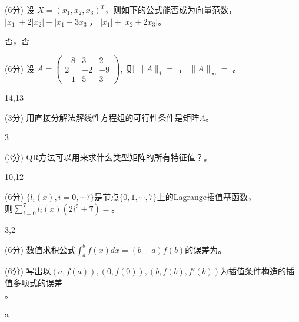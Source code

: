 \documentclass[12pt,letter]{ustcexam}
\def\ds{\displaystyle}
\begin{document}
\begin{problems}
\qu (6分) 设 $X=(x_1,x_2,x_3)^T$，则如下的公式能否成为向量范数， \\
$|x_1|+2|x_2|+|x_1-3x_3|$\twob\oneb ，
$|x_1|+|x_2+2x_3|$\twob\oneb 。
\begin{sol}
 否，否
\end{sol}

\question (6分) 设 $ \ds{A=\begin {pmatrix} -8 & 3 & 2 \\
2 & -2 & -9 \\ -1 & 5 & 3 \end {pmatrix}}$,\  则 $ \|A\|_1=$ \sixb ，
$ \|A\|_\infty =$ \sixb 。
\begin{sol}
14,13
\end{sol}

\qu (3分) 用直接分解法解线性方程组的可行性条件是矩阵$A$\tenb\fourb。
\begin{sol}
3  
\end{sol}

\question (3分) QR方法可以用来求什么类型矩阵的所有特征值？\fourb\fourb 。
\begin{sol}
10,12
\end{sol}

\qu (6分) $\{l_i(x),i=0,\cdots 7\}$是节点$\{0,1,\cdots,7\}$上的Lagrange插值基函数， \\
则$\displaystyle \sum_{i=0}^7l_i(x)(2 i^5+7)=$\twob\fourb。
\begin{sol}
3,2
\end{sol}

\qu (6分) 数值求积公式$ \int_a^b f(x) dx=(b-a)f\left(b\right) $的误差为\tenb。

\qu (6分) 写出以$(a,f(a)),(0,f(0)),(b,f(b),f'(b))$为插值条件构造的插值多项式的误差\\ \sixb\sixb\tenb 。
\begin{sol}
a
\end{sol}


\end{problems}
\end{document}
